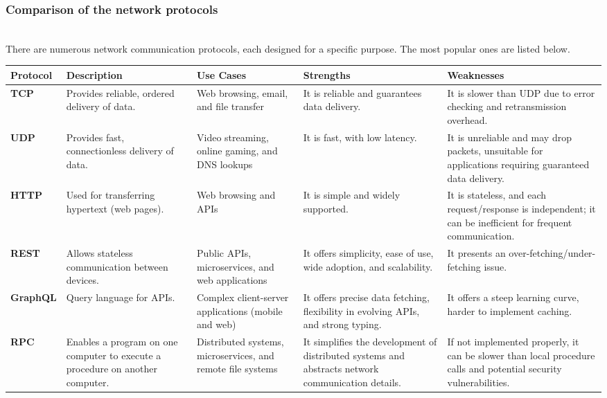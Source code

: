 \subsubsection{Comparison of the network protocols}\label{fdVw4sVTpNOzPFpQUNFcR}
\\
There are numerous network communication protocols, each designed for a specific purpose. The most popular ones are listed below.

\begin{center}
\begin{tabular}{|l|p{3.5cm}|p{3.5cm}|p{3.5cm}|p{3.5cm}|}
\hline
\textbf{Protocol} & \textbf{Description} & \textbf{Use Cases} & \textbf{Strengths} & \textbf{Weaknesses} \\
\hline
\textbf{TCP} & Provides reliable, ordered delivery of data. & Web browsing, email, and file transfer & It is reliable and guarantees data delivery. & It is slower than UDP due to error checking and retransmission overhead. \\
\hline
\textbf{UDP} & Provides fast, connectionless delivery of data. & Video streaming, online gaming, and DNS lookups & It is fast, with low latency. & It is unreliable and may drop packets, unsuitable for applications requiring guaranteed data delivery. \\
\hline
\textbf{HTTP} & Used for transferring hypertext (web pages). & Web browsing and APIs & It is simple and widely supported. & It is stateless, and each request/response is independent; it can be inefficient for frequent communication. \\
\hline
\textbf{REST} & Allows stateless communication between devices. & Public APIs, microservices, and web applications & It offers simplicity, ease of use, wide adoption, and scalability. & It presents an over-fetching/under-fetching issue. \\
\hline
\textbf{GraphQL} & Query language for APIs. & Complex client-server applications (mobile and web) & It offers precise data fetching, flexibility in evolving APIs, and strong typing. & It offers a steep learning curve, harder to implement caching. \\
\hline
\textbf{RPC} & Enables a program on one computer to execute a procedure on another computer. & Distributed systems, microservices, and remote file systems & It simplifies the development of distributed systems and abstracts network communication details. & If not implemented properly, it can be slower than local procedure calls and potential security vulnerabilities. \\

\end{tabular}
\end{center}
